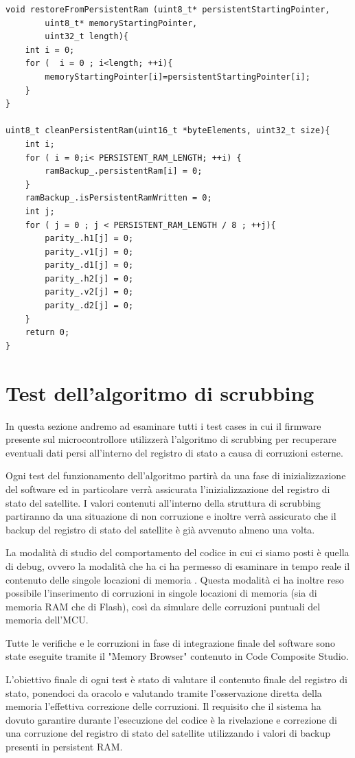\documentclass[LaM,binding=0.6cm,oneside]{../sapthesis}
\begin{document}
\begin{lstlisting}
void restoreFromPersistentRam (uint8_t* persistentStartingPointer,
        uint8_t* memoryStartingPointer,
        uint32_t length){
    int i = 0;
    for (  i = 0 ; i<length; ++i){
        memoryStartingPointer[i]=persistentStartingPointer[i];
    }
}

uint8_t cleanPersistentRam(uint16_t *byteElements, uint32_t size){
    int i;
    for ( i = 0;i< PERSISTENT_RAM_LENGTH; ++i) {
        ramBackup_.persistentRam[i] = 0;
    }
    ramBackup_.isPersistentRamWritten = 0;
    int j;
    for ( j = 0 ; j < PERSISTENT_RAM_LENGTH / 8 ; ++j){
        parity_.h1[j] = 0;
        parity_.v1[j] = 0;
        parity_.d1[j] = 0;
        parity_.h2[j] = 0;
        parity_.v2[j] = 0;
        parity_.d2[j] = 0;
    }
    return 0;
}
\end{lstlisting}
\clearpage

\section{Test dell'algoritmo di scrubbing}

In questa sezione andremo ad esaminare tutti i test cases in cui il firmware presente sul microcontrollore utilizzerà l'algoritmo di scrubbing per recuperare eventuali dati persi all'interno del registro di stato a causa di corruzioni esterne.

Ogni test del funzionamento dell'algoritmo partirà da una fase di inizializzazione del software ed in particolare verrà assicurata l'inizializzazione del registro di stato del satellite. I valori contenuti all'interno della struttura di scrubbing partiranno da una situazione di non corruzione e inoltre verrà assicurato che il backup del registro di stato del satellite è già avvenuto almeno una volta.

La modalità di studio del comportamento del codice in cui ci siamo posti è quella di debug, ovvero la modalità che ha ci ha permesso di esaminare in tempo reale il contenuto delle singole locazioni di memoria .
Questa modalità ci ha inoltre reso possibile l'inserimento di corruzioni in singole locazioni di memoria (sia di memoria RAM che di Flash), così da simulare delle corruzioni puntuali del memoria dell'MCU.

Tutte le verifiche e le corruzioni in fase di integrazione finale del software sono state eseguite tramite il "Memory Browser" contenuto in Code Composite Studio.

L'obiettivo finale di ogni test è stato di valutare il contenuto finale del registro di stato, ponendoci da oracolo e valutando tramite l'osservazione diretta della memoria l'effettiva correzione delle corruzioni.\newline\newline
Il requisito che il sistema ha dovuto garantire durante l'esecuzione del codice è la rivelazione e correzione di una corruzione del registro di stato del satellite utilizzando i valori di backup presenti in persistent RAM.
\end{document}
